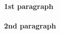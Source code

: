 \documentclass[12pt,a4paper]{article}
\begin{document}
  \textbf{1st paragraph}\\
  \lipsum[1]\\ %
  \textbf{2nd paragraph}\\
  \lipsum[2] %
\end{document}
